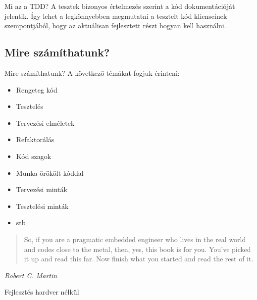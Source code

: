 \begin{frame}{Mi az a TDD?}
  A tesztek bizonyos értelmezés szerint a kód dokumentációját
  jelentik. Így lehet a legkönnyebben megmutatni a tesztelt kód
  klienseinek szempontjából, hogy az aktuálisan fejlesztett részt
  hogyan kell használni.
\end{frame}

\subsection{Mire számíthatunk?}

\begin{frame}{Mire számíthatunk?}
 A következő témákat fogjuk érinteni:

  \begin{itemize}[<+->]
    \item Rengeteg kód
    \item Tesztelés
    \item Tervezési elméletek
    \item Refaktorálás
    \item Kód szagok
    \item Munka örökölt kóddal
    \item Tervezési minták
    \item Tesztelési minták
    \item stb
  \end{itemize}

\end{frame}

\begin{frame}{}
  \begin{quotation}
    So, if you are a pragmatic embedded engineer who
    lives in the real world and codes close to the metal, then, yes, this
    book is for you. You've picked it up and read this far. Now finish
    what you started and read the rest of it.
  \end{quotation}
  \begin{flushright}
    \textit{Robert C. Martin}
  \end{flushright}
\end{frame}

\begin{frame}{Fejlesztés hardver nélkül}

\end{frame}

